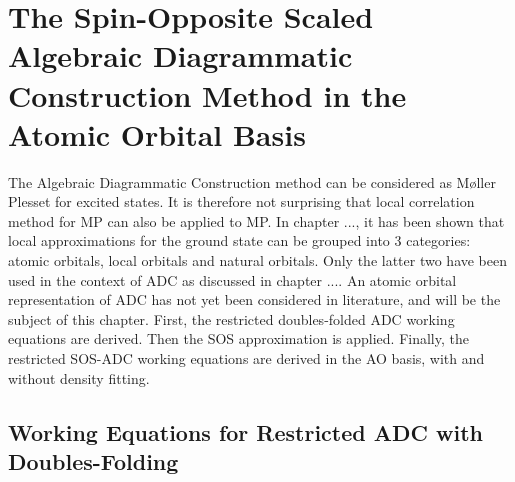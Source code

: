 \chapter{The Spin-Opposite Scaled Algebraic Diagrammatic Construction Method in the Atomic Orbital Basis}

The Algebraic Diagrammatic Construction method can be considered as M{\o}ller Plesset for excited states. It is therefore not surprising that local correlation method for MP can also be applied to MP. In chapter ..., it has been shown that local approximations for the ground state can be grouped into 3 categories: atomic orbitals, local orbitals and natural orbitals. Only the latter two have been used in the context of ADC as discussed in chapter .... An atomic orbital representation of ADC has not yet been considered in literature, and will be the subject of this chapter. First, the restricted doubles-folded ADC working equations are derived. Then the SOS approximation is applied. Finally, the restricted SOS-ADC working equations are derived in the AO basis, with and without density fitting. 

\section{Working Equations for Restricted ADC with Doubles-Folding}

